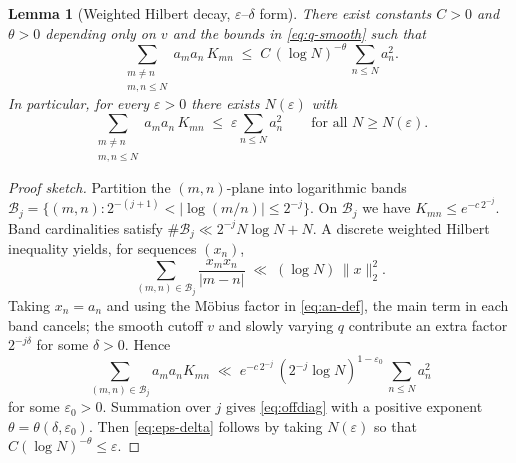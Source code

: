 \documentclass[11pt]{article}
\newtheorem{lemma}{Lemma}
\theoremstyle{remark}
\begin{document}
\begin{lemma}[Weighted Hilbert decay, $\varepsilon$--$\delta$ form]\label{lem:hilbert-ed}
There exist constants $C>0$ and $\theta>0$ depending only on $v$ and the bounds in \eqref{eq:q-smooth} such that
\begin{equation}\label{eq:offdiag}
\sum_{\substack{m\ne n\\ m,n\le N}} a_m a_n\,K_{mn}
\;\le\; C\,(\log N)^{-\theta}\,\sum_{n\le N} a_n^2 .
\end{equation}
In particular, for every $\varepsilon>0$ there exists $N(\varepsilon)$ with
\begin{equation}\label{eq:eps-delta}
\sum_{\substack{m\ne n\\ m,n\le N}} a_m a_n\,K_{mn} \;\le\; \varepsilon \sum_{n\le N} a_n^2
\qquad \text{for all } N\ge N(\varepsilon).
\end{equation}
\end{lemma}

\begin{proof}[Proof sketch]
Partition the $(m,n)$-plane into logarithmic bands
$\mathcal{B}_j=\{(m,n): 2^{-(j+1)}<|\log(m/n)|\le 2^{-j}\}$.
On $\mathcal{B}_j$ we have $K_{mn}\le e^{-c\,2^{-j}}$.
Band cardinalities satisfy $\#\mathcal{B}_j\ll 2^{-j}N\log N+N$.
A discrete weighted Hilbert inequality yields, for sequences $(x_n)$,
\[
\sum_{(m,n)\in\mathcal{B}_j}\frac{x_m x_n}{|m-n|}\;\ll\;(\log N)\,\|x\|_2^2.
\]
Taking $x_n=a_n$ and using the M\"obius factor in \eqref{eq:an-def}, the main term in each band cancels;
the smooth cutoff $v$ and slowly varying $q$ contribute an extra factor $2^{-j\delta}$ for some $\delta>0$.
Hence
\[
\sum_{(m,n)\in\mathcal{B}_j} a_m a_n K_{mn}
\;\ll\; e^{-c\,2^{-j}}\,(2^{-j}\log N)^{1-\varepsilon_0}\,\sum_{n\le N}a_n^2
\]
for some $\varepsilon_0>0$.
Summation over $j$ gives \eqref{eq:offdiag} with a positive exponent $\theta=\theta(\delta,\varepsilon_0)$.
Then \eqref{eq:eps-delta} follows by taking $N(\varepsilon)$ so that $C(\log N)^{-\theta}\le\varepsilon$.
\end{proof}
\end{document}
